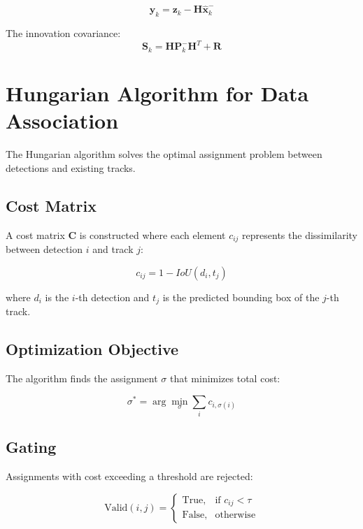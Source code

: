 \documentclass[12pt,a4paper]{report}
\begin{document}
\begin{equation}
\mathbf{y}_k = \mathbf{z}_k - \mathbf{H} \hat{\mathbf{x}}_k^{-}
\end{equation}

The innovation covariance:
\begin{equation}
\mathbf{S}_k = \mathbf{H} \mathbf{P}_k^{-} \mathbf{H}^T + \mathbf{R}
\end{equation}


\section{Hungarian Algorithm for Data Association}

The Hungarian algorithm solves the optimal assignment problem between detections and existing tracks.

\subsection{Cost Matrix}

A cost matrix $\mathbf{C}$ is constructed where each element $c_{ij}$ represents the dissimilarity between detection $i$ and track $j$:

\begin{equation}
c_{ij} = 1 - IoU(d_i, t_j)
\end{equation}

where $d_i$ is the $i$-th detection and $t_j$ is the predicted bounding box of the $j$-th track.

\subsection{Optimization Objective}

The algorithm finds the assignment $\sigma$ that minimizes total cost:

\begin{equation}
\sigma^* = \arg\min_\sigma \sum_{i} c_{i, \sigma(i)}
\end{equation}

\subsection{Gating}

Assignments with cost exceeding a threshold are rejected:

\begin{equation}
\text{Valid}(i, j) =
\begin{cases}
\text{True}, & \text{if } c_{ij} < \tau \\
\text{False}, & \text{otherwise}
\end{cases}
\end{equation}
\end{document}
